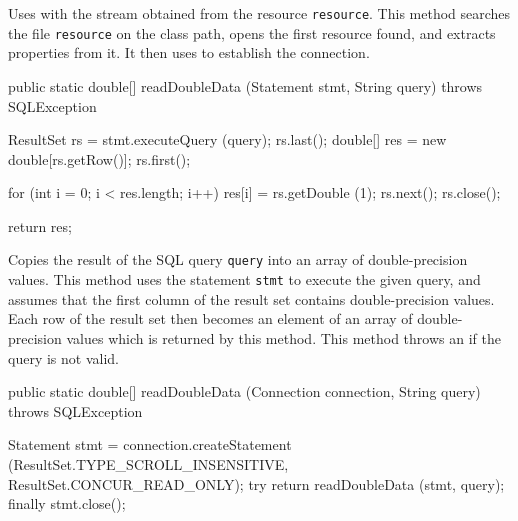 \begin{tabb}
   Uses  with the stream obtained from
   the resource \texttt{resource}.
   This method searches the file \texttt{resource} on the class path, opens
   the first resource found, and extracts properties from it.
   It then uses 
   to establish the connection.
\end{tabb}
\begin{code}

   public static double[] readDoubleData (Statement stmt, String query)
            throws SQLException\begin{hide} {
      ResultSet rs = stmt.executeQuery (query);
      rs.last();
      double[] res = new double[rs.getRow()];
      rs.first();
        
      for (int i = 0; i < res.length; i++)
      {
         res[i] = rs.getDouble (1);
         rs.next();
      }
      rs.close();
            
      return res;
   }\end{hide}
\end{code}
\begin{tabb}
   Copies the result of the SQL query \texttt{query} into an array of double-precision values.
   This method uses the statement \texttt{stmt} to execute the given query, and
   assumes that the first column of the result set contains double-precision values.
   Each row of the result set then becomes an element of an array of double-precision
   values which is returned by this method.
    This method throws an  if the query is not valid.
\end{tabb}
\begin{htmlonly}
\end{htmlonly}
\begin{code}

   public static double[] readDoubleData (Connection connection,
                                          String query)
            throws SQLException\begin{hide} {
      Statement stmt = connection.createStatement
      (ResultSet.TYPE_SCROLL_INSENSITIVE, ResultSet.CONCUR_READ_ONLY);
      try {
         return readDoubleData (stmt, query);
      }
      finally {
         stmt.close();
      }
   }\end{hide}
\end{code}
